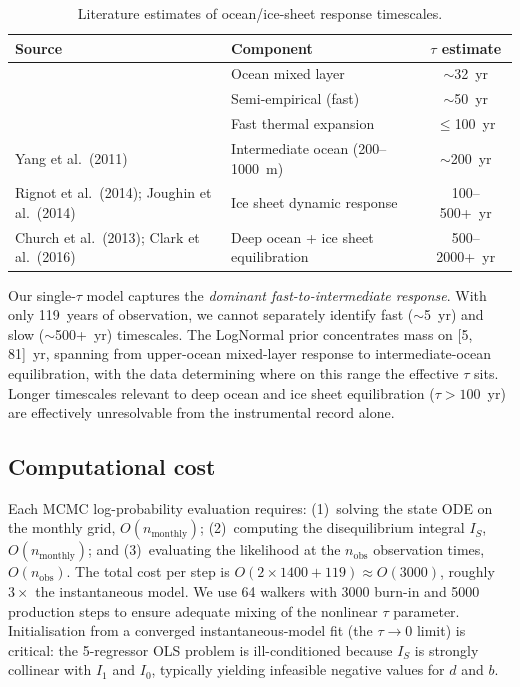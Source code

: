 \documentclass[11pt]{article}
\begin{document}
\begin{table}[ht]
\centering
\caption{Literature estimates of ocean/ice-sheet response timescales.}
\label{tab:tau_lit}
\begin{tabular}{llc}
\toprule
Source & Component & $\tau$ estimate \\
\midrule
\citet{caldeira2013estimating} & Ocean mixed layer & $\sim$32~yr \\
\citet{vermeer2009global} & Semi-empirical (fast) & $\sim$50~yr \\
\citet{mengel2016future} & Fast thermal expansion & $\leq$100~yr \\
Yang et al.\ (2011) & Intermediate ocean (200--1000~m) & $\sim$200~yr \\
Rignot et al.\ (2014); Joughin et al.\ (2014) & Ice sheet dynamic response & 100--500+~yr \\
Church et al.\ (2013); Clark et al.\ (2016) & Deep ocean + ice sheet equilibration & 500--2000+~yr \\
\bottomrule
\end{tabular}
\end{table}

Our single-$\tau$ model captures the \emph{dominant fast-to-intermediate response}.  With only 119~years of observation, we cannot separately identify fast ($\sim$5~yr) and slow ($\sim$500+~yr) timescales.  The LogNormal prior concentrates mass on [5, 81]~yr, spanning from upper-ocean mixed-layer response to intermediate-ocean equilibration, with the data determining where on this range the effective $\tau$ sits.  Longer timescales relevant to deep ocean and ice sheet equilibration ($\tau > 100$~yr) are effectively unresolvable from the instrumental record alone.

\subsection{Computational cost}

Each MCMC log-probability evaluation requires: (1)~solving the state ODE on the monthly grid, $O(n_{\text{monthly}})$; (2)~computing the disequilibrium integral $I_S$, $O(n_{\text{monthly}})$; and (3)~evaluating the likelihood at the $n_{\text{obs}}$ observation times, $O(n_{\text{obs}})$.  The total cost per step is $O(2 \times 1400 + 119) \approx O(3000)$, roughly $3\times$ the instantaneous model.  We use 64 walkers with 3000 burn-in and 5000 production steps to ensure adequate mixing of the nonlinear $\tau$ parameter.  Initialisation from a converged instantaneous-model fit (the $\tau \to 0$ limit) is critical: the 5-regressor OLS problem is ill-conditioned because $I_S$ is strongly collinear with $I_1$ and $I_0$, typically yielding infeasible negative values for $d$ and $b$.
\end{document}
